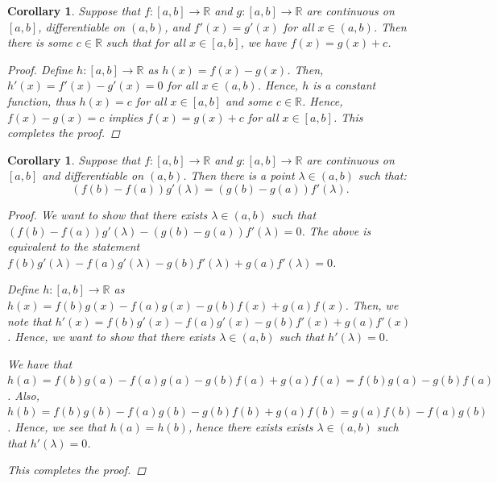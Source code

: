 \documentclass[11pt]{article}
\newcommand{\bbR}{\mathbb{R}}
\renewcommand{\_}[1]{\underline{ #1 }}
\newtheorem{corollary}[theorem]{Corollary}
\theoremstyle{definition}
\numberwithin{equation}{subsection}
\begin{document}
	
\begin{corollary}
	Suppose that $f\colon [a, b] \to \bbR$ and $g\colon [a, b] \to \bbR$ are continuous on $[a, b]$, differentiable on $(a, b)$, and $f'(x) = g'(x)$ for all $x \in (a, b)$. Then there is some $c\in\bbR$ such that for all $x \in [a, b]$, we have $f(x) = g(x) + c$.
    
\begin{proof}

Define $h: [a,b] \rightarrow \bbR$ as $h(x)=f(x)-g(x)$. Then, $h'(x)=f'(x)-g'(x)=0$ for all $x\in (a,b)$. Hence, $h$ is a constant function, thus $h(x)=c$ for all $x\in [a,b]$ and some $c \in \bbR$. Hence, $f(x)-g(x)=c$ implies $f(x)=g(x)+c$ for all $x\in [a,b]$. This completes the proof.


\renewcommand\qedsymbol{QED}
\end{proof}


\end{corollary} 



\begin{corollary}	
	Suppose that $f\colon [a, b] \to \bbR$ and $g\colon[a, b] \to \bbR$ are continuous on $[a, b]$ and differentiable on $(a, b)$. Then there is a point $\lambda \in (a, b)$ such that:
	\[
		(f(b)-f(a))g'(\lambda) = (g(b)-g(a))f'(\lambda).
	\]
    
\begin{proof}

We want to show that there exists $\lambda \in (a,b)$ such that $(f(b)-f(a))g'(\lambda) - (g(b)-g(a))f'(\lambda)=0$. The above is equivalent to the statement $f(b)g'(\lambda)-f(a)g'(\lambda) - g(b)f'(\lambda)+g(a)f'(\lambda)=0$.

Define $h: [a,b] \rightarrow \bbR$ as $h(x)=f(b)g(x)-f(a)g(x)-g(b)f(x)+g(a)f(x)$. Then, we note that $h'(x)=f(b)g'(x)-f(a)g'(x) - g(b)f'(x)+g(a)f'(x)$. Hence, we want to show that there exists $\lambda \in (a,b)$ such that $h'(\lambda)=0$. 

We have that $h(a)=f(b)g(a)-f(a)g(a)-g(b)f(a)+g(a)f(a)=f(b)g(a)-g(b)f(a)$. Also, $h(b)=f(b)g(b)-f(a)g(b)-g(b)f(b)+g(a)f(b)=g(a)f(b)-f(a)g(b)$. Hence, we see that $h(a)=h(b)$, hence there exists exists $\lambda \in (a,b)$ such that $h'(\lambda)=0$.

This completes the proof.

\renewcommand\qedsymbol{QED}
\end{proof}


\end{corollary}
\end{document}
